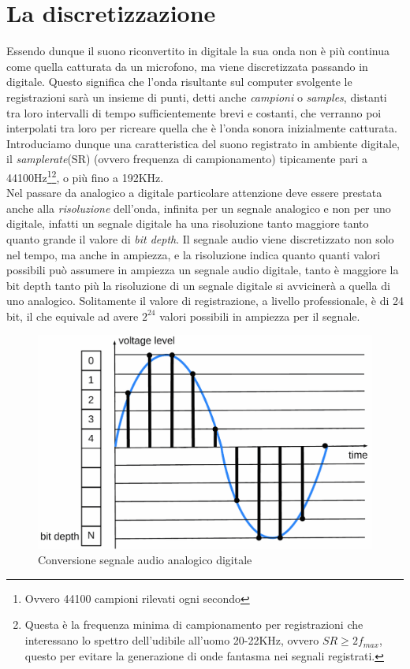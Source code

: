 \section{La discretizzazione}
Essendo dunque il suono riconvertito in digitale la sua onda non è più continua come quella catturata da un microfono, ma viene discretizzata passando in digitale. Questo significa che l'onda risultante sul computer svolgente le registrazioni sarà un insieme di punti, detti anche \emph{campioni} o \emph{samples}, distanti tra loro intervalli di tempo sufficientemente brevi e costanti, che verranno poi interpolati tra loro per ricreare quella che è l'onda sonora inizialmente catturata. Introduciamo dunque una caratteristica del suono registrato in ambiente digitale, il \emph{samplerate}(SR) (ovvero frequenza di campionamento) tipicamente pari a 44100Hz\footnote{Ovvero 44100 campioni rilevati ogni secondo}\footnote{Questa è la frequenza minima di campionamento per registrazioni che interessano lo spettro dell'udibile all'uomo 20-22KHz, ovvero $SR\ge2f_{max}$, questo per evitare la generazione di onde fantasma nei segnali registrati.}, o più fino a 192KHz.\\
Nel passare da analogico a digitale particolare attenzione deve essere prestata anche alla \emph{risoluzione} dell'onda, infinita per un segnale analogico e non per uno digitale, infatti un segnale digitale ha una risoluzione tanto maggiore tanto quanto grande il valore di \emph{bit depth}. Il segnale audio viene discretizzato non solo nel tempo, ma anche in ampiezza, e la risoluzione indica quanto quanti valori possibili può assumere in ampiezza un segnale audio digitale, tanto è maggiore la bit depth tanto più la risoluzione di un segnale digitale si avvicinerà a quella di uno analogico. Solitamente il valore di registrazione, a livello professionale, è di 24 bit, il che equivale ad avere $2^{24}$ valori possibili in ampiezza per il segnale.\\
\begin{figure}[h]
	\begin{center}
		\includegraphics[scale=0.2]{./immagini/discretizazione-suono.png}
	\end{center}
	\caption{Conversione segnale audio analogico digitale}\label{fig:SR-bitdepth}
\end{figure}
